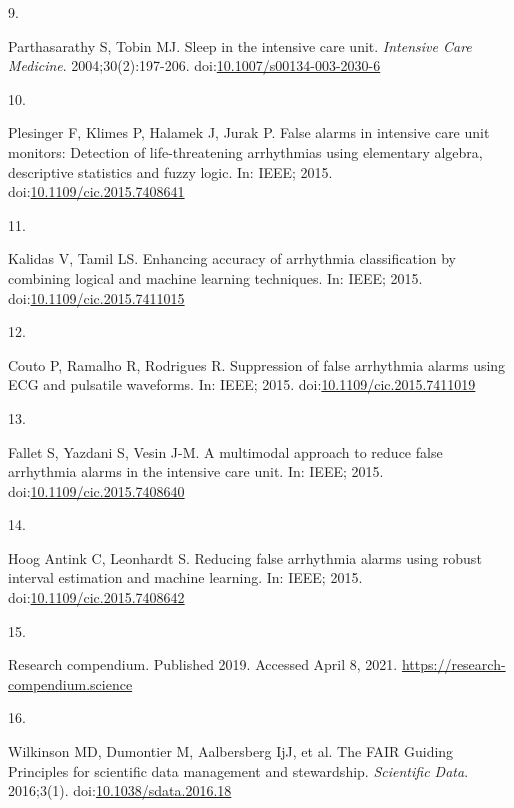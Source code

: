 \documentclass[12pt,twoside]{fmupthesis}
\newlength{\csllabelwidth}
\newlength{\cslhangindent}
\newenvironment{CSLReferences}[2] %
 {%
  \setlength{\parindent}{0pt}
  \ifodd #1 \everypar{\setlength{\hangindent}{\cslhangindent}}\ignorespaces\fi
  \ifnum #2 > 0
  \setlength{\parskip}{#2\baselineskip}
  \fi
 }%
 {}
\newcommand{\CSLLeftMargin}[1]{\parbox[t]{\csllabelwidth}{#1}}
\newcommand{\CSLRightInline}[1]{\parbox[t]{\linewidth - \csllabelwidth}{#1}}
\begin{document}
\begin{CSLReferences}{0}{0}
\leavevmode{}%
\CSLLeftMargin{9. }
\CSLRightInline{Parthasarathy S, Tobin MJ. Sleep in the intensive care unit. \emph{Intensive Care Medicine}. 2004;30(2):197-206. doi:\href{https://doi.org/10.1007/s00134-003-2030-6}{10.1007/s00134-003-2030-6}}

\leavevmode{}%
\CSLLeftMargin{10. }
\CSLRightInline{Plesinger F, Klimes P, Halamek J, Jurak P. False alarms in intensive care unit monitors: Detection of life-threatening arrhythmias using elementary algebra, descriptive statistics and fuzzy logic. In: IEEE; 2015. doi:\href{https://doi.org/10.1109/cic.2015.7408641}{10.1109/cic.2015.7408641}}

\leavevmode{}%
\CSLLeftMargin{11. }
\CSLRightInline{Kalidas V, Tamil LS. Enhancing accuracy of arrhythmia classification by combining logical and machine learning techniques. In: IEEE; 2015. doi:\href{https://doi.org/10.1109/cic.2015.7411015}{10.1109/cic.2015.7411015}}

\leavevmode{}%
\CSLLeftMargin{12. }
\CSLRightInline{Couto P, Ramalho R, Rodrigues R. Suppression of false arrhythmia alarms using ECG and pulsatile waveforms. In: IEEE; 2015. doi:\href{https://doi.org/10.1109/cic.2015.7411019}{10.1109/cic.2015.7411019}}

\leavevmode{}%
\CSLLeftMargin{13. }
\CSLRightInline{Fallet S, Yazdani S, Vesin J-M. A multimodal approach to reduce false arrhythmia alarms in the intensive care unit. In: IEEE; 2015. doi:\href{https://doi.org/10.1109/cic.2015.7408640}{10.1109/cic.2015.7408640}}

\leavevmode{}%
\CSLLeftMargin{14. }
\CSLRightInline{Hoog Antink C, Leonhardt S. Reducing false arrhythmia alarms using robust interval estimation and machine learning. In: IEEE; 2015. doi:\href{https://doi.org/10.1109/cic.2015.7408642}{10.1109/cic.2015.7408642}}

\leavevmode{}%
\CSLLeftMargin{15. }
\CSLRightInline{Research compendium. Published 2019. Accessed April 8, 2021. \url{https://research-compendium.science}}

\leavevmode{}%
\CSLLeftMargin{16. }
\CSLRightInline{Wilkinson MD, Dumontier M, Aalbersberg IjJ, et al. The FAIR Guiding Principles for scientific data management and stewardship. \emph{Scientific Data}. 2016;3(1). doi:\href{https://doi.org/10.1038/sdata.2016.18}{10.1038/sdata.2016.18}}


\end{CSLReferences}
\end{document}
